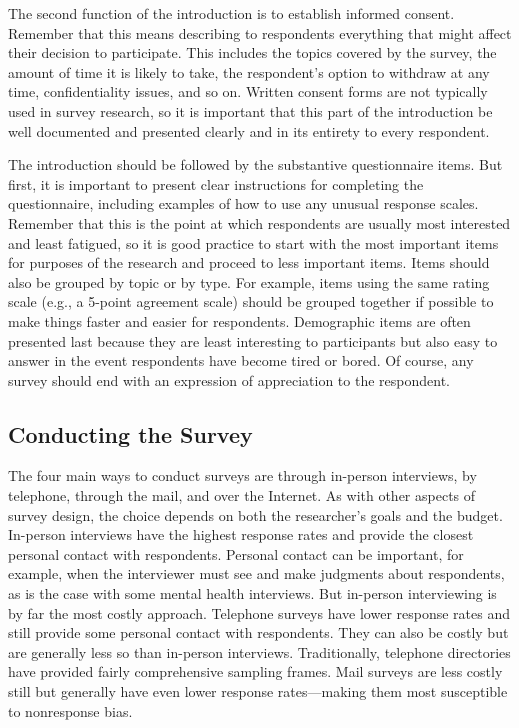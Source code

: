 \documentclass[
]{krantz}
\begin{document}
The second function of the introduction is to establish informed consent. Remember that this means describing to respondents everything that might affect their decision to participate. This includes the topics covered by the survey, the amount of time it is likely to take, the respondent's option to withdraw at any time, confidentiality issues, and so on. Written consent forms are not typically used in survey research, so it is important that this part of the introduction be well documented and presented clearly and in its entirety to every respondent.

The introduction should be followed by the substantive questionnaire items. But first, it is important to present clear instructions for completing the questionnaire, including examples of how to use any unusual response scales. Remember that this is the point at which respondents are usually most interested and least fatigued, so it is good practice to start with the most important items for purposes of the research and proceed to less important items. Items should also be grouped by topic or by type. For example, items using the same rating scale (e.g., a 5-point agreement scale) should be grouped together if possible to make things faster and easier for respondents. Demographic items are often presented last because they are least interesting to participants but also easy to answer in the event respondents have become tired or bored. Of course, any survey should end with an expression of appreciation to the respondent.

\hypertarget{conducting-the-survey}{%
\subsection*{Conducting the Survey}\label{conducting-the-survey}}


The four main ways to conduct surveys are through in-person interviews, by telephone, through the mail, and over the Internet. As with other aspects of survey design, the choice depends on both the researcher's goals and the budget. In-person interviews have the highest response rates and provide the closest personal contact with respondents. Personal contact can be important, for example, when the interviewer must see and make judgments about respondents, as is the case with some mental health interviews. But in-person interviewing is by far the most costly approach. Telephone surveys have lower response rates and still provide some personal contact with respondents. They can also be costly but are generally less so than in-person interviews. Traditionally, telephone directories have provided fairly comprehensive sampling frames. Mail surveys are less costly still but generally have even lower response rates---making them most susceptible to nonresponse bias.
\end{document}
